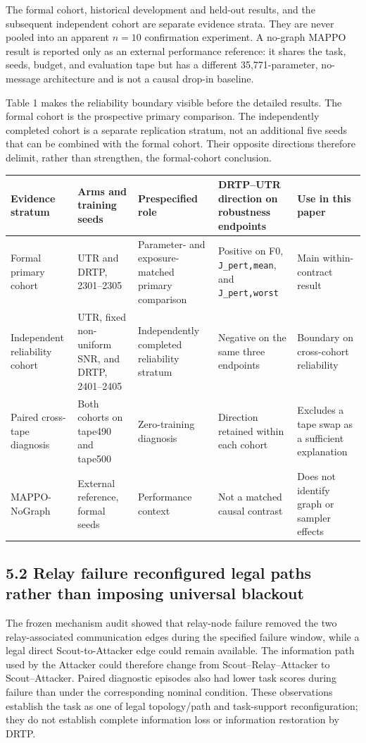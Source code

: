 The formal cohort, historical development and held-out results, and the subsequent independent cohort are separate evidence strata. They are never pooled into an apparent $n=10$ confirmation experiment. A no-graph MAPPO result is reported only as an external performance reference: it shares the task, seeds, budget, and evaluation tape but has a different 35,771-parameter, no-message architecture and is not a causal drop-in baseline.

Table 1 makes the reliability boundary visible before the detailed results. The formal cohort is the prospective primary comparison. The independently completed cohort is a separate replication stratum, not an additional five seeds that can be combined with the formal cohort. Their opposite directions therefore delimit, rather than strengthen, the formal-cohort conclusion.

\begin{center}
\begin{tabular}{lllll}
\toprule
Evidence stratum & Arms and training seeds & Prespecified role & DRTP--UTR direction on robustness endpoints & Use in this paper \\
\midrule
Formal primary cohort & UTR and DRTP, 2301--2305 & Parameter- and exposure-matched primary comparison & Positive on F0, \texttt{J_pert,mean}, and \texttt{J_pert,worst} & Main within-contract result \\
Independent reliability cohort & UTR, fixed non-uniform SNR, and DRTP, 2401--2405 & Independently completed reliability stratum & Negative on the same three endpoints & Boundary on cross-cohort reliability \\
Paired cross-tape diagnosis & Both cohorts on tape490 and tape500 & Zero-training diagnosis & Direction retained within each cohort & Excludes a tape swap as a sufficient explanation \\
MAPPO-NoGraph & External reference, formal seeds & Performance context & Not a matched causal contrast & Does not identify graph or sampler effects \\
\bottomrule
\end{tabular}
\end{center}

\subsection{5.2 Relay failure reconfigured legal paths rather than imposing universal blackout}

The frozen mechanism audit showed that relay-node failure removed the two relay-associated communication edges during the specified failure window, while a legal direct Scout-to-Attacker edge could remain available. The information path used by the Attacker could therefore change from Scout--Relay--Attacker to Scout--Attacker. Paired diagnostic episodes also had lower task scores during failure than under the corresponding nominal condition. These observations establish the task as one of legal topology/path and task-support reconfiguration; they do not establish complete information loss or information restoration by DRTP.

